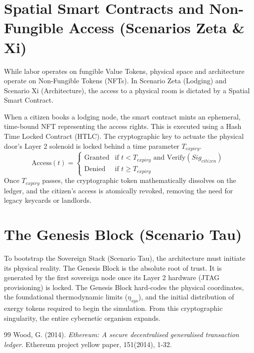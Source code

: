 \section{Spatial Smart Contracts and Non-Fungible Access (Scenarios Zeta \& Xi)}
While labor operates on fungible Value Tokens, physical space and architecture operate on Non-Fungible Tokens (NFTs). In Scenario Zeta (Lodging) and Scenario Xi (Architecture), the access to a physical room is dictated by a Spatial Smart Contract.

When a citizen books a lodging node, the smart contract mints an ephemeral, time-bound NFT representing the access rights. This is executed using a Hash Time Locked Contract (HTLC). The cryptographic key to actuate the physical door's Layer 2 solenoid is locked behind a time parameter $T_{expiry}$.
\begin{equation}
\text{Access}(t) = 
\begin{cases} 
\text{Granted} & \text{if } t < T_{expiry} \text{ and } \text{Verify}(Sig_{citizen}) \\
\text{Denied} & \text{if } t \ge T_{expiry}
\end{cases}
\end{equation}
Once $T_{expiry}$ passes, the cryptographic token mathematically dissolves on the ledger, and the citizen's access is atomically revoked, removing the need for legacy keycards or landlords.

\section{The Genesis Block (Scenario Tau)}
To bootstrap the Sovereign Stack (Scenario Tau), the architecture must initiate its physical reality. The Genesis Block is the absolute root of trust. It is generated by the first sovereign node once its Layer 2 hardware (JTAG provisioning) is locked. The Genesis Block hard-codes the physical coordinates, the foundational thermodynamic limits ($\eta_{sys}$), and the initial distribution of exergy tokens required to begin the simulation. From this cryptographic singularity, the entire cybernetic organism expands.

\vspace{1cm}
\begin{thebibliography}{99}
Wood, G. (2014). \textit{Ethereum: A secure decentralised generalised transaction ledger}. Ethereum project yellow paper, 151(2014), 1-32.
\end{thebibliography}
